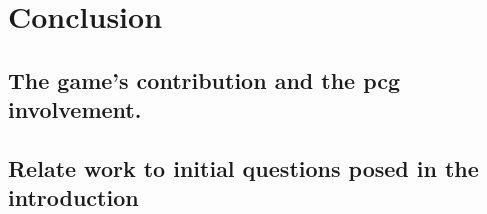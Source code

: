 \section{Conclusion}
\subsection{The game's contribution and the pcg involvement. }
\subsection{Relate work to initial questions posed in the introduction}

